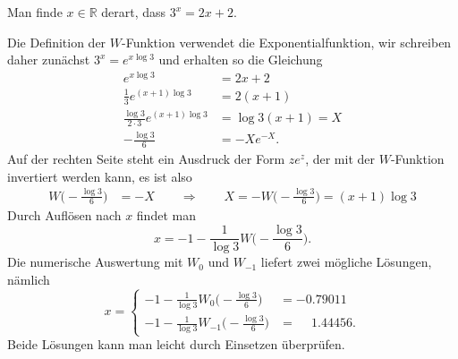 Man finde $x\in\mathbb{R}$ derart, dass $3^x=2x+2$.

\begin{loesung}
Die Definition der $W$-Funktion verwendet die Exponentialfunktion,
wir schreiben daher zunächst $3^x = e^{x\log 3}$ und erhalten so
die Gleichung
\begin{align*}
e^{x\log 3} &= 2x+2
\\
\frac{1}{3}e^{(x+1)\log 3}
&=2(x+1)
\\
\frac{\log 3}{2\cdot 3}e^{(x+1)\log 3}
&=\log 3(x+1)
=
X
\\
-\frac{\log 3}{6}
&=
-Xe^{-X}.
\end{align*}
Auf der rechten Seite steht ein Ausdruck der Form $ze^z$, der mit der
$W$-Funktion invertiert werden kann, es ist also
\begin{align*}
W\biggl(
-\frac{\log 3}{6}
\biggr)
&=
-X
\qquad\Rightarrow\qquad
X=
-W\biggl(
-\frac{\log 3}{6}
\biggr)
=
(x+1)
\log 3
\end{align*}
Durch Auflösen nach $x$ findet man
\[
x
=
-1
-
\frac{1}{\log 3}
W\biggl(
-\frac{\log 3}{6}
\biggr).
\]
Die numerische Auswertung mit $W_0$ und $W_{-1}$ liefert zwei mögliche
Lösungen, nämlich
\[
x
=
\begin{cases}
\displaystyle -1-\frac{1}{\log 3} W_0\biggl(-\frac{\log 3}{6}\biggr)&=-0.79011
\\[8pt]
\displaystyle -1-\frac{1}{\log 3} W_{-1}\biggl(-\frac{\log 3}{6}\biggr)&=\phantom{-}1.44456.
\end{cases}
\]
Beide Lösungen kann man leicht durch Einsetzen überprüfen.
\end{loesung}
